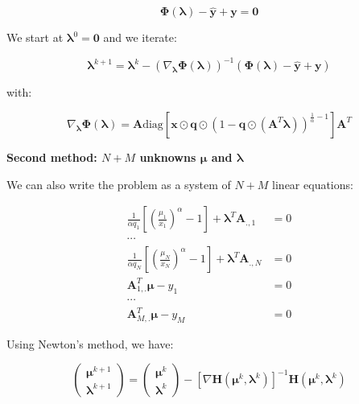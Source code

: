 \documentclass{tex/note}
\begin{document}
\begin{equation*}
\bm{\Phi} \left( \bm{\lambda} \right) - \hat{\bm{y}} + \bm{y} = \bm{0}
\end{equation*}

We start at $\bm{\lambda}^0 = \bm{0}$ and we iterate:

\begin{equation*}
\bm{\lambda}^{k + 1} = \bm{\lambda}^k - \left( \nabla_{\bm{\lambda}} \bm{\Phi} \left( \bm{\lambda} \right) \right) ^{-1} \left( \bm{\Phi} \left( \bm{\lambda} \right) - \hat{\bm{y}} + \bm{y} \right)
\end{equation*}

with:

\begin{equation*}
\nabla_{\bm{\lambda}} \bm{\Phi} \left( \bm{\lambda} \right) = \bm{A} \text{diag} \left[ \bm{x} \odot \bm{q} \odot \left( 1 - \bm{q} \odot \left( \bm{A}^T \bm{\lambda} \right) \right)^{\frac{1}{\alpha} - 1} \right] \bm{A}^T
\end{equation*}

\textbf{Second method: $N + M$ unknowns $\bm{\mu}$ and $\bm{\lambda}$}

We can also write the problem as a system of $N + M$ linear equations:

\begin{align*}
\frac{1}{\alpha q_1} \left[ \left( \frac{\mu_1}{x_1} \right) ^{\alpha} - 1\right] + \bm{\lambda}^T \bm{A}_{.,1} &= 0 \\
\cdots & \\
\frac{1}{\alpha q_N} \left[ \left( \frac{\mu_N}{x_N} \right) ^{\alpha} - 1\right] + \bm{\lambda}^T \bm{A}_{.,N} &= 0 \\
\bm{A}_{1,.}^T \bm{\mu} - y_1 &= 0 \\
\cdots & \\
\bm{A}_{M,.}^T \bm{\mu} - y_M &= 0
\end{align*}

Using Newton's method, we have:

\begin{equation*}
\begin{pmatrix} \bm{\mu}^{k + 1} \\ \bm{\lambda}^{k + 1} \end{pmatrix} = \begin{pmatrix} \bm{\mu}^k \\ \bm{\lambda}^k \end{pmatrix} - \left[ \nabla \bm{H} \left( \bm{\mu}^k , \bm{\lambda}^k \right) \right] ^{-1} \bm{H} \left( \bm{\mu}^k , \bm{\lambda}^k \right)
\end{equation*}
\end{document}
